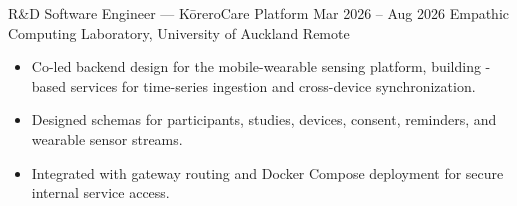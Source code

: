 \CVExperienceEntry
{R\&D Software Engineer — KōreroCare Platform}
{Mar 2026 -- Aug 2026}
{Empathic Computing Laboratory, University of Auckland}
{Remote}

\begin{itemize}[leftmargin=*, itemsep=0.2em, topsep=0.1em]
  \item Co-led backend design for the  mobile-wearable sensing platform, building -based services for time-series ingestion and cross-device synchronization.
  \item Designed  schemas for participants, studies, devices, consent, reminders, and wearable sensor streams.
  \item Integrated  with  gateway routing and Docker Compose deployment for secure internal service access.
\end{itemize}
